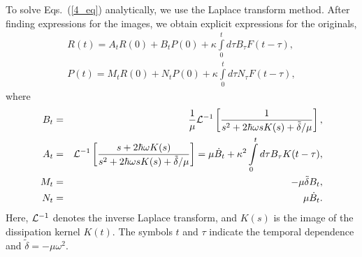 \documentclass[preprint,review,12pt]{elsarticle}
\begin{document}
  To solve Eqs.~(\ref{4_eq}) analytically, we use the Laplace transform method. After finding expressions for the
  images, we obtain explicit expressions for the originals,
  \begin{eqnarray}
  R(t)=A_t R(0)+B_t P(0)+\kappa\int\limits_{0}^{t}d\tau B_\tau F(t-\tau),\nonumber\\
  P(t)=M_t R(0)+N_t P(0)+\kappa\int\limits_{0}^{t}d\tau N_\tau F(t-\tau),
  \label{7_eq}
  \end{eqnarray}
  where
  \begin{eqnarray}
  B_t&=&\frac{1}{\mu} {\cal L}^{-1}\left[\frac{1}{s^2+2\hbar\omega sK(s)+\tilde\delta/\mu}\right],\nonumber\\
  A_t&=&{\cal L}^{-1} \left[\frac{s+2\hbar\omega K(s)}{s^2+2\hbar\omega sK(s)+\tilde\delta/\mu}\right]=
  \mu\dot B_t + \kappa^2\int\limits_{0}^{t}d\tau B_\tau K(t-\tau),\nonumber\\
  M_t&=&-\mu{\tilde \delta} B_t,\nonumber\\
  N_t&=&\mu\dot B_t.
  \label{ABfun}
  \end{eqnarray}
  Here, ${\cal L}^{-1}$ denotes the inverse Laplace transform, and $K(s)$ is the image of the dissipation kernel $K(t)$.
  The symbols $t$ and $\tau$ indicate the temporal dependence and $\tilde{\delta}=-\mu\omega^2$.
\end{document}
